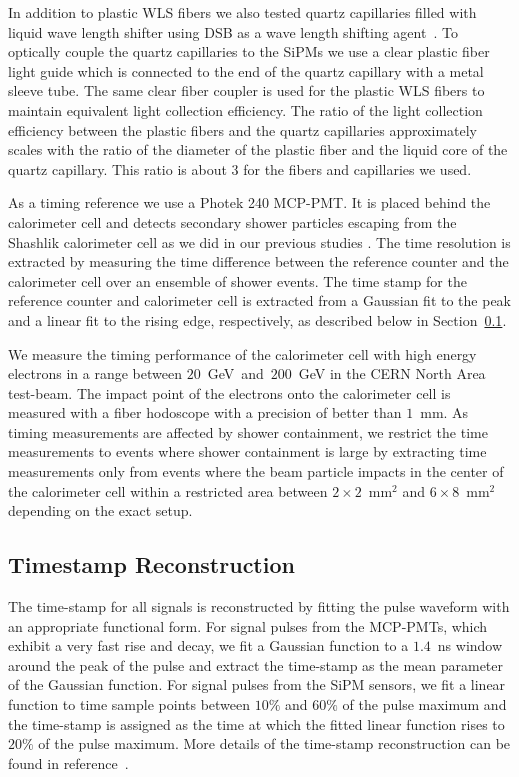 In addition to plastic WLS fibers we also tested quartz capillaries filled with
liquid wave length shifter using DSB as a wave length shifting
agent~\cite{Baumbaugh:2016vcg}. To optically couple the quartz capillaries to the
SiPMs we use a clear plastic fiber light guide which is connected to the end of
the quartz capillary with a metal sleeve tube. The same clear fiber coupler is
used for the plastic WLS fibers to maintain equivalent light collection
efficiency. The ratio of the light collection efficiency between the plastic
fibers and the quartz capillaries approximately scales with the ratio of the
diameter of the plastic fiber and the liquid core of the quartz capillary. This
ratio is about $3$ for the fibers and capillaries we used.

As a timing reference we use a Photek 240 MCP-PMT. It is placed behind the
calorimeter cell and detects secondary shower particles escaping from the
Shashlik calorimeter cell as we did in our previous studies \cite{Anderson:2015gha}.
The time resolution is extracted by measuring the time difference between the
reference counter and the calorimeter cell over an ensemble of shower events.
The time stamp for the reference counter and calorimeter cell is extracted
from a Gaussian fit to the peak and a linear fit to the rising edge, 
respectively, as described below in Section~\ref{sec:reco}.

We measure the timing performance of the calorimeter cell with high energy
electrons in a range between $20$~GeV~and~$200$~GeV in the CERN North Area
test-beam. The impact point of the electrons onto the calorimeter cell is
measured with a fiber hodoscope with a precision of better than $1$~mm. As
timing measurements are affected by shower containment, we restrict the time
measurements to events where shower containment is large by extracting time
measurements only from events where the beam particle impacts in the center of
the calorimeter cell within a restricted area between
$2\times2$~$\mathrm{mm}^{2}$ and $6\times8$~$\mathrm{mm}^{2}$ depending on the
exact setup. 

\subsection{Timestamp Reconstruction}
\label{sec:reco}
The time-stamp for all signals is reconstructed by fitting the pulse waveform
with an appropriate functional form. For signal pulses from the MCP-PMTs, which
exhibit a very fast rise and decay, we fit a Gaussian function to a $1.4$~ns
window around the peak of the pulse and extract the time-stamp as the mean
parameter of the Gaussian function. For signal pulses from the SiPM sensors, we
fit a linear function to time sample points between $10\%$ and $60\%$ of the
pulse maximum and the time-stamp is assigned as the time at which the fitted
linear function rises to $20\%$ of the pulse maximum. More details of the
time-stamp reconstruction can be found in reference~\cite{Anderson:2015gha}.
